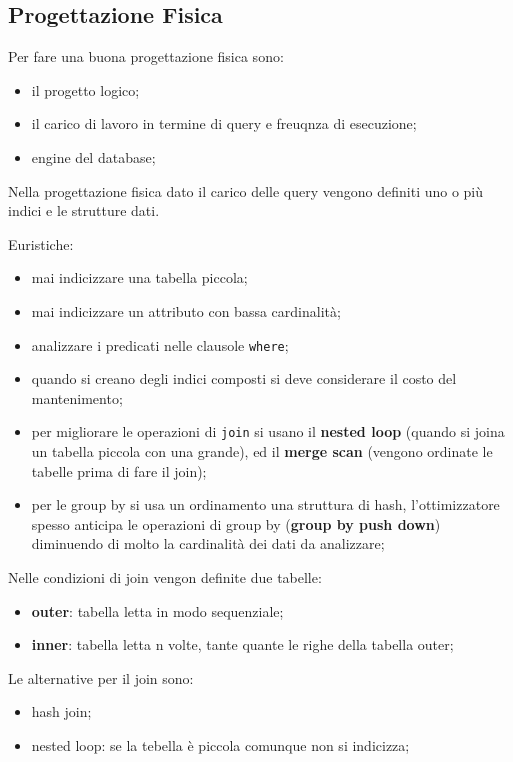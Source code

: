 \documentclass[12pt]{article}
\begin{document}
\subsection{Progettazione Fisica}
Per fare una buona progettazione fisica sono:
\begin{itemize}
    \item il progetto logico;
    \item il carico di lavoro in termine di query e freuqnza di esecuzione;
    \item engine del database;
\end{itemize}
Nella progettazione fisica dato il carico delle query vengono definiti uno o pi\`u indici e le strutture dati.

Euristiche:
\begin{itemize}
    \item mai indicizzare una tabella piccola;
    \item mai indicizzare un attributo con bassa cardinalit\`a;
    \item analizzare i predicati nelle clausole \texttt{where};
    \item quando si creano degli indici composti si deve considerare il costo del mantenimento;
    \item per migliorare le operazioni di \texttt{join} si usano il \textbf{nested loop} (quando si joina un tabella piccola con una grande), ed il \textbf{merge scan} (vengono ordinate le tabelle prima di fare il join);
    \item per le group by si usa un ordinamento una struttura di hash, l'ottimizzatore spesso anticipa le operazioni di group by (\textbf{group by push down}) diminuendo di molto la cardinalit\`a dei dati da analizzare;
\end{itemize}

Nelle condizioni di join vengon definite due tabelle:
\begin{itemize}
    \item \textbf{outer}: tabella letta in modo sequenziale;
    \item \textbf{inner}: tabella letta n volte, tante quante le righe della tabella outer;
\end{itemize}
Le alternative per il join sono:
\begin{itemize}
    \item hash join;
    \item nested loop: se la tebella \`e piccola comunque non si indicizza;
\end{itemize}
\end{document}
